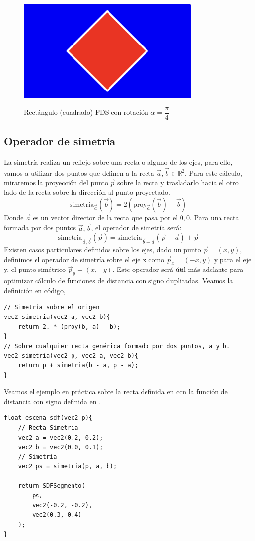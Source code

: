 \begin{figure}[H]
  \centering
  \captionsetup{justification=centering}%
  \includegraphics[width=0.8\textwidth]{secciones/imagenes/sdf_rotacion.jpeg}\label{fig:rotacion}
  \caption{Rectángulo (cuadrado) FDS con rotación \(\alpha=\dfrac{\pi}{4}\)}
\end{figure}

\subsection{Operador de simetría}
La simetría realiza un reflejo sobre una recta o alguno de los ejes, para ello, vamos a utilizar dos puntos que definen a la recta \(\Vec{a}, \Vec{b}\in\mathbb{R}^2\).
Para este cálculo, miraremos la proyección del punto \(\Vec{p}\) sobre la recta y trasladarlo hacia el otro lado de la recta sobre la dirección al punto proyectado.
\[\text{simetria}_{\Vec{a}}(\Vec{b})=2(\text{proy}_{\Vec{a}}(\Vec{b})-\Vec{b})\]
Donde \(\Vec{a}\) es un vector director de la recta que pasa por el \(0,0\). Para una recta formada por dos puntos \(\Vec{a}, \Vec{b}\), el operador de simetría será:
\[\text{simetria}_{\Vec{a},\Vec{b}}(\Vec{p}) = \text{simetria}_{\Vec{b}-\Vec{a}}(\Vec{p}-\Vec{a})+\Vec{p}\]
Existen casos particulares definidos sobre los ejes, dado un punto \(\Vec{p}=(x,y)\), definimos el operador de simetría sobre el eje x como \(\Vec{p}_x=(-x,y)\) y para el eje y, el punto simétrico \(\Vec{p}_y=(x,-y)\). Este operador será útil más adelante para optimizar cálculo de funciones de distancia con signo duplicadas.
\newpage
Veamos la definición en código,
\begin{lstlisting}
// Simetría sobre el origen
vec2 simetria(vec2 a, vec2 b){    
    return 2. * (proy(b, a) - b);
}
// Sobre cualquier recta genérica formado por dos puntos, a y b.
vec2 simetria(vec2 p, vec2 a, vec2 b){    
    return p + simetria(b - a, p - a);
}
\end{lstlisting}
Veamos el ejemplo en práctica sobre la recta definida en  con la función de distancia con signo definida en .
\begin{lstlisting}
float escena_sdf(vec2 p){
    // Recta Simetría
    vec2 a = vec2(0.2, 0.2);
    vec2 b = vec2(0.0, 0.1);
    // Simetría
    vec2 ps = simetria(p, a, b);
    
    return SDFSegmento(
        ps,
        vec2(-0.2, -0.2), 
        vec2(0.3, 0.4)
    );
}
\end{lstlisting}


